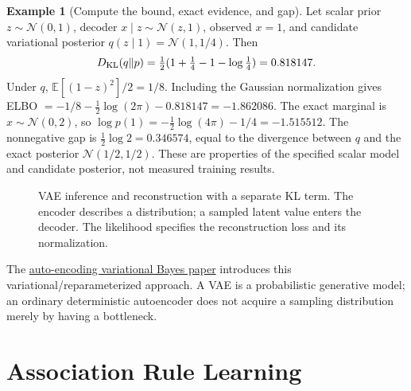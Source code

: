 \documentclass[11pt,twoside]{article}
\numberwithin{equation}{section}
\newcommand{\E}{\mathbb{E}}
\newcommand{\vect}[1]{\bm{#1}}
\newcommand{\mat}[1]{\bm{#1}}
\theoremstyle{plain}
\theoremstyle{definition}
\newtheorem{example}[theorem]{Example}
\theoremstyle{remark}
\begin{document}
\begin{example}[Compute the bound, exact evidence, and gap]
Let scalar prior $z\sim\mathcal N(0,1)$, decoder $x\mid z\sim\mathcal N(z,1)$, observed $x=1$, and candidate variational posterior $q(z\mid1)=\mathcal N(1,1/4)$. Then
\[
D_{\rm KL}(q\|p)=\tfrac12(1+\tfrac14-1-\log\tfrac14)=0.818147.
\]
Under $q$, $\E[(1-z)^2]/2=1/8$. Including the Gaussian normalization gives ELBO $=-1/8-\tfrac12\log(2\pi)-0.818147=-1.862086$. The exact marginal is $x\sim\mathcal N(0,2)$, so $\log p(1)=-\tfrac12\log(4\pi)-1/4=-1.515512$. The nonnegative gap is $\tfrac12\log2=0.346574$, equal to the divergence between $q$ and the exact posterior $\mathcal N(1/2,1/2)$. These are properties of the specified scalar model and candidate posterior, not measured training results.
\end{example}
\begin{figure}[H]
\centering
{}
\caption{VAE inference and reconstruction with a separate KL term. The encoder describes a distribution; a sampled latent value enters the decoder. The likelihood specifies the reconstruction loss and its normalization.}
\end{figure}
The \href{https://arxiv.org/abs/1312.6114}{auto-encoding variational Bayes paper} introduces this variational/reparameterized approach. A VAE is a probabilistic generative model; an ordinary deterministic autoencoder does not acquire a sampling distribution merely by having a bottleneck.

\section{Association Rule Learning}
\label{sec:association-rules}
\end{document}
